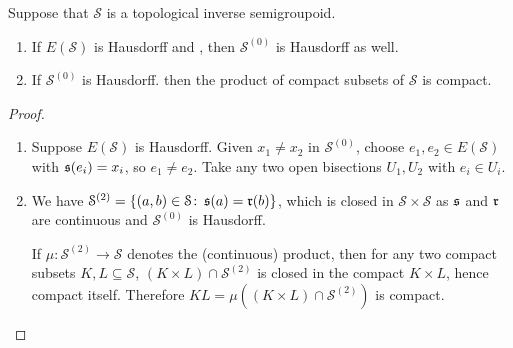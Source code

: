 \begin{lemma}\label{lem:ES.Hausdorff.and.S0.Hausdorff}
    Suppose that $\mathcal{S}$ is a topological inverse semigroupoid.
    \begin{enumerate}[label=(\alph*)]
        \item\label{lem:ES.Hausdorff.and.S0.Hausdorff1} If $E(\mathcal{S})$ is Hausdorff and , then $\mathcal{S}^{(0)}$ is Hausdorff as well.
        \item\label{lem:ES.Hausdorff.and.S0.Hausdorff2} If $\mathcal{S}^{(0)}$ is Hausdorff. then the product of compact subsets of $\mathcal{S}$ is compact.
    \end{enumerate}
\end{lemma}
\begin{proof}
    \begin{enumerate}[label={\ref{lem:ES.Hausdorff.and.S0.Hausdorff\theenumi}}]
    \item Suppose $E(\mathcal{S})$ is Hausdorff. Given $x_1\neq x_2$ in $\mathcal{S}^{(0)}$, choose $e_1,e_2\in E(\mathcal{S})$ with $\operatorname{\mathfrak{s}}(e_i)=x_i$, so $e_1\neq e_2$. Take any two open bisections $U_1,U_2$ with $e_i\in U_i$. 
    \item We have $\mathcal{S}^{(2)}=\left\{(a,b)\in\mathcal{S}\colon \operatorname{\mathfrak{s}}(a)=\operatorname{\mathfrak{r}}(b)\right\}$, which is closed in $\mathcal{S}\times\mathcal{S}$ as $\operatorname{\mathfrak{s}}$ and $\operatorname{\mathfrak{r}}$ are continuous and $\mathcal{S}^{(0)}$ is Hausdorff.
    
    If $\mu\colon\mathcal{S}^{(2)}\to\mathcal{S}$ denotes the (continuous) product, then for any two compact subsets $K,L\subseteq\mathcal{S}$, $(K\times L)\cap\mathcal{S}^{(2)}$ is closed in the compact $K\times L$, hence compact itself. Therefore $KL=\mu((K\times L)\cap\mathcal{S}^{(2)})$ is compact.\qedhere
    \end{enumerate}
\end{proof}


